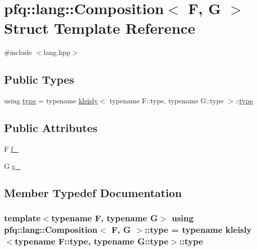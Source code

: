 \hypertarget{structpfq_1_1lang_1_1Composition}{}\section{pfq\+:\+:lang\+:\+:Composition$<$ F, G $>$ Struct Template Reference}
\label{structpfq_1_1lang_1_1Composition}


{\ttfamily \#include $<$lang.\+hpp$>$}

\subsection*{Public Types}
\begin{DoxyCompactItemize}
\item 
using \hyperlink{structpfq_1_1lang_1_1Composition_aa426436e2a83824156469c75930bb542}{type} = typename \hyperlink{structpfq_1_1lang_1_1kleisly}{kleisly}$<$ typename F\+::type, typename G\+::type $>$\+::\hyperlink{structpfq_1_1lang_1_1Composition_aa426436e2a83824156469c75930bb542}{type}
\end{DoxyCompactItemize}
\subsection*{Public Attributes}
\begin{DoxyCompactItemize}
\item 
F \hyperlink{structpfq_1_1lang_1_1Composition_a347bd26bc6d78fe7540e7e5f641fe69d}{f\+\_\+}
\item 
G \hyperlink{structpfq_1_1lang_1_1Composition_aabe9600a5e6184509c5ac8ae9685271e}{g\+\_\+}
\end{DoxyCompactItemize}


\subsection{Member Typedef Documentation}
\subsubsection[{\texorpdfstring{type}{type}}]{\setlength{\rightskip}{0pt plus 5cm}template$<$typename F, typename G$>$ using {\bf pfq\+::lang\+::\+Composition}$<$ F, G $>$\+::{\bf type} =  typename {\bf kleisly}$<$typename F\+::type, typename G\+::type$>$\+::{\bf type}}\hypertarget{structpfq_1_1lang_1_1Composition_aa426436e2a83824156469c75930bb542}{}\label{structpfq_1_1lang_1_1Composition_aa426436e2a83824156469c75930bb542}



